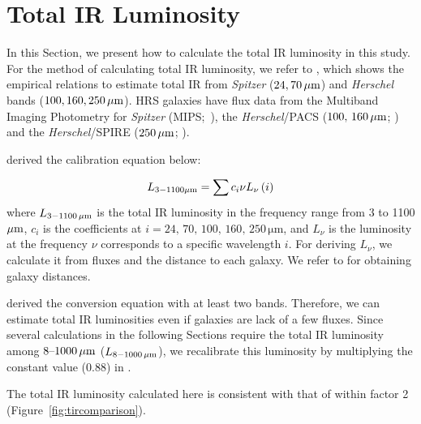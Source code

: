 \section{Total IR Luminosity}\label{sec:tirluminosity}
In this Section, we present how to calculate the total IR luminosity in this study.
For the method of calculating total IR luminosity, we refer to \citet{Galametz2013}, which shows the empirical relations to estimate total IR from {\it Spitzer\/} ($24, 70\,\mathrm{\mu m}$) and {\it Herschel\/} bands ($100, 160, 250\,\mathrm{\mu m}$).
HRS galaxies have flux data from the Multiband Imaging Photometry for {\it Spitzer\/} (MIPS;~\citealt{Rieke2004, Bendo2012}), the {\it Herschel\/}/PACS ($100,\,160\,\mathrm{\mu m}$; \citealt{Cortese2014c}) and the {\it Herschel\/}/SPIRE ($250\,\mathrm{\mu m}$; \citealt{Ciesla2012a}).

\citet{Galametz2013} derived the calibration equation below:

\begin{equation}\label{eq:galametz}
    L_{\mathrm{3-1100\mathrm{\mu m}}} = \sum c_i \nu L_{\nu}\left(i\right)
\end{equation}
where $L_{\mathrm{3-1100\,\mu m}}$ is the total IR luminosity in the frequency range from 3 to 1100 $\mathrm{\mu m}$, $c_i$ is the coefficients at $i = 24,\,70,\,100,\,160,\,250\,\mathrm{\mu m}$, and $L_{\nu}$ is the luminosity at the frequency $\nu$ corresponds to a specific wavelength $i$.
For deriving $L_{\nu}$, we calculate it from fluxes and the distance to each galaxy.
We refer to \citet{Cortese2012} for obtaining galaxy distances.

\citet{Galametz2013} derived the conversion equation with at least two bands.
Therefore, we can estimate total IR luminosities even if galaxies are lack of a few fluxes.
Since several calculations in the following Sections require the total IR luminosity among $8 \mbox{--} 1000\,\mathrm{\mu m}$ ($L_{\mathrm{8-1000\,\mathrm{\mu m}}}$), we recalibrate this luminosity by multiplying the constant value (0.88) in \citet{Takeuchi2005}.

The total IR luminosity calculated here is consistent with that of \citet{Ciesla2014} within factor 2 (Figure~\ref{fig:tircomparison}).

